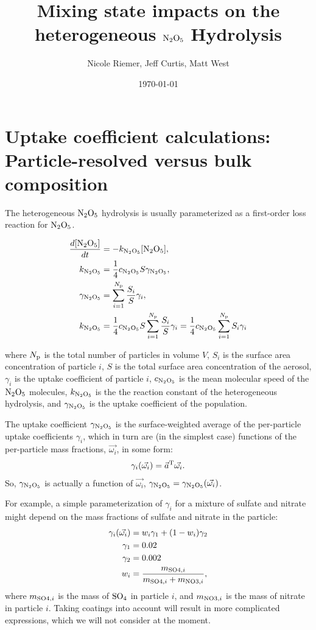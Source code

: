 \documentclass[11pt]{article}
\title{Mixing state impacts on the heterogeneous $\rm
  N_2O_5$ Hydrolysis}
\author{Nicole Riemer, Jeff Curtis, Matt West}
\date{\today}
\begin{document}
\maketitle

\section{Uptake coefficient calculations: Particle-resolved versus bulk composition}

The heterogeneous $\rm N_2O_5$ hydrolysis is usually parameterized as
a first-order loss reaction for $\rm N_2O_5$.

\begin{align}
  \frac{d{\rm [N_2O_5]}}{dt} & = - k_{\rm N_2O_5} {\rm [N_2O_5]}, \\
    k_{\rm N_2O_5} & = \frac{1}{4} c_{\rm  N_2O_5} S \gamma_{\rm N_2O_5}, \\
    \gamma_{\rm N_2O_5} & = \sum_{i=1}^{N_{\rm p}} \frac{S_i}{S} \gamma_i, \\
    k_{\rm N_2O_5} & = \frac{1}{4} c_{\rm  N_2O_5} S \sum_{i=1}^{N_{\rm p}} \frac{S_i}{S} \gamma_i = \frac{1}{4} c_{\rm  N_2O_5} \sum_{i=1}^{N_{\rm p}}S_i \gamma_i \label{eq:k}
\end{align}

where $N_{\rm p}$ is the total number of particles in volume $V$,
$S_i$ is the surface area concentration of particle $i$, $S$ is the
total surface area concentration of the aerosol, $\gamma_i$ is the
uptake coefficient of particle $i$, $c_{\rm N_2O_5}$ is the mean
molecular speed of the $\rm N_2O_5$ molecules, $k_{\rm N_2O_5}$ is the
the reaction constant of the heterogeneous hydrolysis, and $\gamma_{\rm
  N_2O_5}$ is the uptake coefficient of the population.

The uptake coefficient $\gamma_{\rm N_2O_5}$ is the surface-weighted
average of the per-particle uptake coefficients $\gamma_i$, which in
turn are (in the simplest case) functions of the per-particle mass
fractions, $\vec{\omega_i}$, in some form:
\begin{align} \label{eq:gamma_i}
  \gamma_i(\vec{\omega_i}) = \vec{a}^{\rm T} \vec{\omega_i}. 
\end{align}
So, $\gamma_{\rm N_2O_5}$ is actually a function of $\vec{\omega_i}$,
$\gamma_{\rm N_2O_5}= \gamma_{\rm N_2O_5}(\vec{\omega_i})$.

For example, a simple parameterization of $\gamma_i$ for a mixture of
sulfate and nitrate might depend on the mass fractions of sulfate and
nitrate in the particle:
\begin{align} \label{eq:n2o5_param}
  \gamma_i(\vec{\omega_i}) & = w_i \gamma_1 + (1-w_i) \gamma_2 \\
  \gamma_1 & = 0.02 \\
  \gamma_2 &= 0.002 \\
  w_i &= \frac{m_{{\rm SO4}, i}}{m_{{\rm SO4}, i} + m_{{\rm NO3}, i}},
\end{align}
where $m_{{\rm SO4}, i}$ is the mass of $\rm SO_4$ in particle $i$,
and $m_{{\rm NO3}, i}$ is the mass of nitrate in particle $i$. Taking
coatings into account will result in more complicated expressions,
which we will not consider at the moment.
\end{document}
